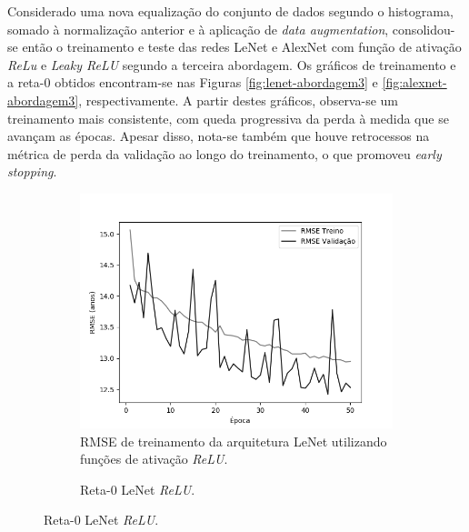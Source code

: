 	Considerado uma nova equalização do conjunto de dados segundo o histograma, somado à normalização anterior e à aplicação de \emph{data augmentation}, consolidou-se então o treinamento e teste das redes LeNet e AlexNet com função de ativação \emph{ReLu} e \emph{Leaky ReLU} segundo a terceira abordagem. Os gráficos de treinamento e a reta-0 obtidos encontram-se nas Figuras \ref{fig:lenet-abordagem3} e \ref{fig:alexnet-abordagem3}, respectivamente. A partir destes gráficos, observa-se um treinamento mais consistente, com queda progressiva da perda à medida que se avançam as épocas. Apesar disso, nota-se também que houve retrocessos na métrica de perda da validação ao longo do treinamento, o que promoveu \emph{early stopping}.


	\begin{figure}[hb!]
		\caption{Resultados do treinamento e teste da CNN LeNet de acordo com a Abordagem 3.}\label{fig:lenet-abordagem3}
		\begin{subfigure}[hb]{0.5\linewidth}
			\caption{RMSE de treinamento da arquitetura LeNet utilizando funções de ativação \emph{ReLU}.}
			\includegraphics[width=\linewidth]{img/graficos/history/lenet/fig-history-image-treat-3-lenet-relu-rmse.png}%
		\end{subfigure}%
		\begin{subfigure}[hb]{0.5\linewidth}
			\caption{Reta-0 LeNet \emph{ReLU}.}

\end{subfigure}
\end{figure}
